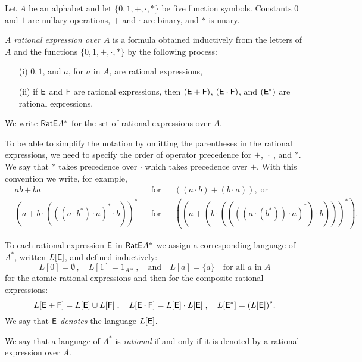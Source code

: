 Let $A$ be an alphabet and let $\{0, 1, +, \cdot, *\}$ be five function symbols. Constants $0$ and $1$ are nullary operations, $+$ and $\cdot$ are binary, and $*$ is unary.

\begin{defn}
    \emph{A rational expression over $A$} is a formula obtained inductively from the letters of $A$ and the functions $\{0, 1, +, \cdot, *\}$ by the following process:
    \begin{itemize}
        \item[(i)] $0, 1$, and $a$, for $a$ in $A$, are rational expressions,
        \item[(ii)] if ${\mathsf{E}}$ and ${\mathsf{F}}$ are rational expressions, then $({\mathsf{E}} + {\mathsf{F}})$, $({\mathsf{E}} \cdot {\mathsf{F}})$, and $({\mathsf{E}}^*)$ are rational expressions.
    \end{itemize}
    We write ${\mathsf{RatE}} A^*$ for the set of rational expressions over $A$.
\end{defn}

To be able to simplify the notation by omitting the parentheses in the rational expressions, we need to specify the order of operator precedence for $+, \: \cdot \:$, and $*$. We say that $*$ takes precedence over $\cdot$ which takes precedence over $+$. With this convention we write, for example,
\begin{align*}
    &ab + ba & &\text{for} & &((a \cdot b) + (b \cdot a)), \; \text{or}\\
    &{(a + b \cdot ({((a \cdot b^* ) \cdot a)}^* \cdot b))}^* & &\text{for} & &({(a + (b \cdot (({((a \cdot (b^*)) \cdot a)}^* ) \cdot b)))}^* ) .
\end{align*}

\begin{defn}
    To each rational expression ${\mathsf{E}}$ in ${\mathsf{RatE}} A^*$ we assign a corresponding language of $A^*$, written $L[{\mathsf{E}}]$, and defined inductively:
    \[
        L[0] = \emptyset \, , \quad L[1] = 1_{A*} \, , \quad \text{and} \quad L[a] = \{a\} \quad \text{for all $a$ in $A$}
    \]
    for the atomic rational expressions and then for the composite rational expressions:
    \[
        L[{\mathsf{E}} + {\mathsf{F}}] = L[{\mathsf{E}}] \cup L[{\mathsf{F}}] \; , \quad L[{\mathsf{E}} \cdot {\mathsf{F}}] = L[{\mathsf{E}}] \cdot L[{\mathsf{E}}] \; , \quad L[{\mathsf{E}}^*] = {(L[{\mathsf{E}}])}^*.
    \]
    We say that ${\mathsf{E}}$ \emph{denotes} the language $L[{\mathsf{E}}]$.
\end{defn}

We say that a language of $A^*$ is \emph{rational} if and only if it is denoted by a rational expression over $A$.

